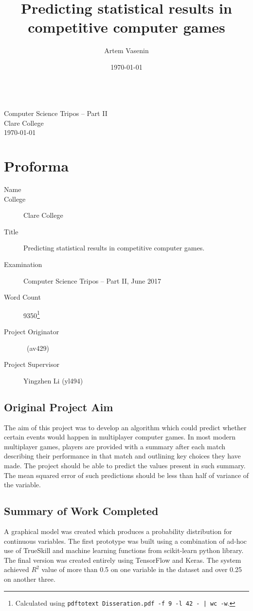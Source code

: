 \documentclass[12pt,a4paper]{book}
\title{Predicting statistical results in competitive computer games}
\author{Artem Vasenin}
\date{\today}
\newcommand\college{Clare College}
\begin{document}
\frontmatter


\pagestyle{empty}

\rightline{\LARGE \textbf{\@author}}

\vspace*{60mm}
\begin{center}
\Huge
\textbf{\@title} \\[5mm]
Computer Science Tripos -- Part II \\[5mm]
\college \\[5mm]
\today  %
\end{center}



\cleardoublepage
\pagestyle{plain}
\section*{Proforma}
\begin{description}
\item[Name] \@author
\item[College] \college
\item[Title] Predicting statistical results in competitive computer games.
\item[Examination] Computer Science Tripos -- Part II, June 2017
\item[Word Count] 9350\footnote{Calculated using \texttt{pdftotext Disseration.pdf -f 9 -l 42  - | wc -w}.} %
\item[Project Originator] \@author\ (av429)
\item[Project Supervisor] Yingzhen Li (yl494)
\end{description}

\subsection*{Original Project Aim}
The aim of this project was to develop an algorithm which could predict whether certain events would happen in multiplayer computer games.
In most modern multiplayer games, players are provided with a summary after each match describing their performance in that match and outlining key choices they have made.
The project should be able to predict the values present in such summary.
The mean squared error of such predictions should be less than half of variance of the variable.
\subsection*{Summary of Work Completed}
A graphical model was created which produces a probability distribution for continuous variables.
The first prototype was built using a combination of ad-hoc use of TrueSkill and machine learning functions from scikit-learn python library.
The final version was created entirely using TensorFlow and Keras.
The system achieved $R^2$ value of more than 0.5 on one variable in the dataset and over 0.25 on another three.
\end{document}
